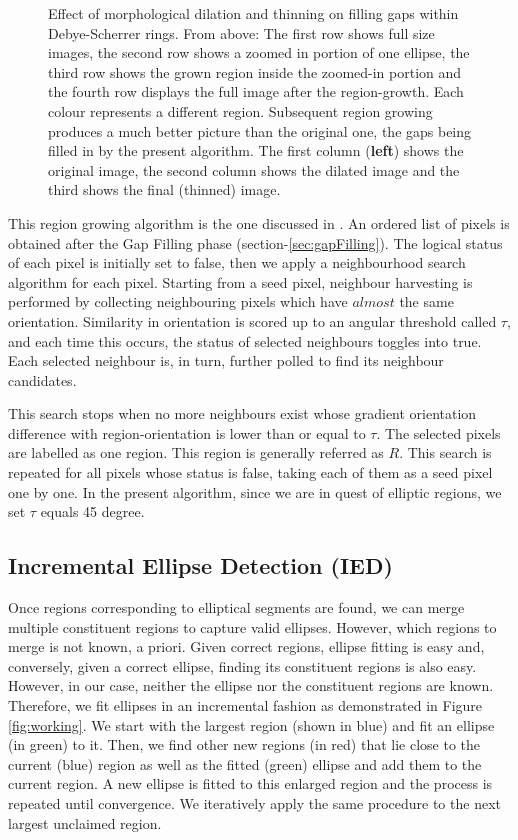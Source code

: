 \documentclass[preprint]{iucr}              %
\newcommand\dsrs{Debye-Scherrer rings}
\begin{document}
\begin{figure}
\caption{Effect of morphological dilation and thinning on filling gaps within {\dsrs}. 
From above: The first row shows full size images, the second row shows a zoomed
in portion of one ellipse, the third row shows the grown region inside the
zoomed-in portion and the fourth row displays the full image after the
region-growth. Each colour represents a different region. Subsequent region
growing produces a much better picture than the original one, the gaps being
filled in by the present algorithm. The first column (\textbf{left}) shows the
original image, the second column shows the dilated image and the third shows
the final (thinned) image.}       

\label{fig:Dilt_Thin}
\end{figure}


This region growing algorithm is the one discussed in \cite{puatruaucean12A}.
An ordered list of pixels is obtained after the Gap Filling phase
(section-\ref{sec:gapFilling}). 
The logical status of each pixel is initially set to false, then we apply a
neighbourhood search algorithm for each pixel. 
Starting from a seed pixel, neighbour harvesting is performed by collecting
neighbouring pixels which have $almost$ the same orientation. 
Similarity in orientation is scored up to an angular threshold called $\tau$,
and each time this occurs, the status of selected neighbours toggles into true. 
Each selected neighbour is, in turn, further polled to find its neighbour
candidates. 

This search stops when no more neighbours exist whose gradient orientation
difference with region-orientation is lower than or equal to $\tau$.
The selected pixels are labelled as one region.
This region is generally referred as $R$.
This search is repeated for all pixels whose status is false, taking each of
them as a seed pixel one by one. 
In the present algorithm, since we are in quest of elliptic regions, we set
$\tau$ equals 45 degree. 

\subsection{Incremental Ellipse Detection (IED)} \label{subsec:EllipseGrow}
Once regions corresponding to elliptical segments are found, we can merge
multiple constituent regions to capture valid ellipses. 
However, which regions to merge is not known, a priori.
Given correct regions, ellipse fitting is easy and, conversely, given a correct
ellipse, finding its constituent regions is also easy. 
However, in our case, neither the ellipse nor the constituent regions are known.
Therefore, we fit ellipses in an incremental fashion as demonstrated in Figure
\ref{fig:working}. 
We start with the largest region (shown in blue) and fit an ellipse (in green)
to it. 
Then, we find other new regions (in red) that lie close to the current (blue)
region as well as the fitted (green) ellipse and add them to the current region.  
A new ellipse is fitted to this enlarged region and the process is repeated
until convergence. 
We iteratively apply the same procedure to the next largest unclaimed region.
\end{document}
